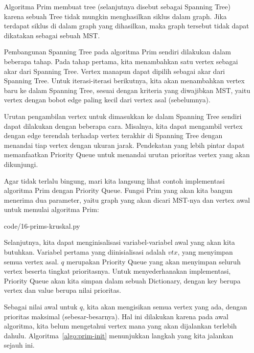 Algoritma Prim membuat tree (selanjutnya disebut sebagai Spanning Tree) karena sebuah Tree tidak mungkin menghasilkan siklus dalam graph. Jika terdapat siklus di dalam graph yang dihasilkan, maka graph tersebut tidak dapat dikatakan sebagai sebuah MST.

Pembangunan Spanning Tree pada algoritma Prim sendiri dilakukan dalam beberapa tahap. Pada tahap pertama, kita menambahkan satu vertex sebagai akar dari Spanning Tree. Vertex manapun dapat dipilih sebagai akar dari Spanning Tree. Untuk iterasi-iterasi berikutnya, kita akan menambahkan vertex baru ke dalam Spanning Tree, sesuai dengan kriteria yang diwajibkan MST, yaitu vertex dengan bobot edge paling kecil dari vertex asal (sebelumnya).

Urutan pengambilan vertex untuk dimasukkan ke dalam Spanning Tree sendiri dapat dilakukan dengan beberapa cara. Misalnya, kita dapat mengambil vertex dengan edge terendah terhadap vertex terakhir di Spanning Tree dengan menandai tiap vertex dengan ukuran jarak. Pendekatan yang lebih pintar dapat memanfaatkan Priority Queue untuk menandai urutan prioritas vertex yang akan dikunjungi.

Agar tidak terlalu bingung, mari kita langsung lihat contoh implementasi algoritma Prim dengan Priority Queue. Fungsi Prim yang akan kita bangun menerima dua parameter, yaitu graph yang akan dicari MST-nya dan vertex awal untuk memulai algoritma Prim:


                {code/16-prims-kruskal.py}

Selanjutnya, kita dapat menginisalisasi variabel-variabel awal yang akan kita butuhkan. Variabel pertama yang diinisialisasi adalah $vtx$, yang menyimpan semua vertex asal. $q$ merupakan Priority Queue yang akan menyimpan seluruh vertex beserta tingkat prioritasnya. Untuk menyederhanakan implementasi, Priority Queue akan kita simpan dalam sebuah Dictionary, dengan key berupa vertex dan value berupa nilai prioritas.

Sebagai nilai awal untuk $q$, kita akan mengisikan semua vertex yang ada, dengan prioritas maksimal (sebesar-besarnya). Hal ini dilakukan karena pada awal algoritma, kita belum mengetahui vertex mana yang akan dijalankan terlebih dahulu. Algoritma~\ref{algo:prim-init} menunjukkan langkah yang kita jalankan sejauh ini.

